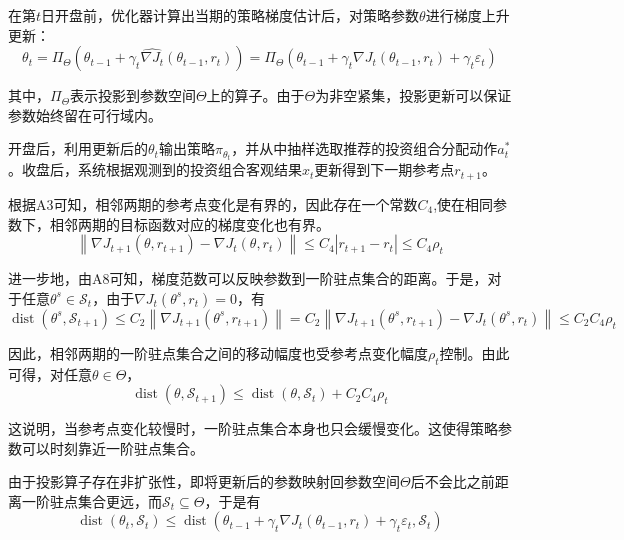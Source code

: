 \documentclass{sufethesismas}
\begin{document}
在第$t$日开盘前，优化器计算出当期的策略梯度估计后，对策略参数$\theta$进行梯度上升更新：
\begin{equation}
\theta_t
=
\Pi_{\Theta}
\left(
\theta_{t-1}
+
\gamma_t
\widehat{\nabla J_t}(\theta_{t-1},r_t)
\right)
=
\Pi_{\Theta}
\left(
\theta_{t-1}
+
\gamma_t \nabla J_t(\theta_{t-1},r_t)
+
\gamma_t \varepsilon_t
\right)
\end{equation}

其中，$\Pi_{\Theta}$表示投影到参数空间$\Theta$上的算子。由于$\Theta$为非空紧集，投影更新可以保证参数始终留在可行域内。

开盘后，利用更新后的$\theta_t$输出策略$\pi_{\theta_t}$，并从中抽样选取推荐的投资组合分配动作$a_t^*$。收盘后，系统根据观测到的投资组合客观结果$x_t$更新得到下一期参考点$r_{t+1}$。

根据A3可知，相邻两期的参考点变化是有界的，因此存在一个常数$C_4$,使在相同参数下，相邻两期的目标函数对应的梯度变化也有界。
\begin{equation}
\left\|
\nabla J_{t+1}(\theta,r_{t+1})-\nabla J_t(\theta,r_t)
\right\|
\le
C_4
\left|
r_{t+1}-r_t
\right|
\le
C_4 \rho_t
\end{equation}

进一步地，由A8可知，梯度范数可以反映参数到一阶驻点集合的距离。于是，对于任意$\theta^s \in \mathcal S_t$，由于$\nabla J_t(\theta^s,r_t)=0$，有
\begin{equation}
\operatorname{dist}(\theta^s,\mathcal S_{t+1})
\le
C_2
\left\|
\nabla J_{t+1}(\theta^s,r_{t+1})
\right\|
=
C_2
\left\|
\nabla J_{t+1}(\theta^s,r_{t+1})-\nabla J_t(\theta^s,r_t)
\right\|
\le
C_2 C_4 \rho_t
\end{equation}

因此，相邻两期的一阶驻点集合之间的移动幅度也受参考点变化幅度$\rho_t$控制。由此可得，对任意$\theta \in \Theta$，
\begin{equation}
\operatorname{dist}(\theta,\mathcal S_{t+1})
\le
\operatorname{dist}(\theta,\mathcal S_t)
+
C_2 C_4 \rho_t
\end{equation}

这说明，当参考点变化较慢时，一阶驻点集合本身也只会缓慢变化。这使得策略参数可以时刻靠近一阶驻点集合。

由于投影算子存在非扩张性，即将更新后的参数映射回参数空间$\Theta$后不会比之前距离一阶驻点集合更远，而$\mathcal S_t \subseteq \Theta$，于是有
\begin{equation}
\operatorname{dist}(\theta_t,\mathcal S_t)
\le
\operatorname{dist}
\left(
\theta_{t-1}
+
\gamma_t \nabla J_t(\theta_{t-1},r_t)
+
\gamma_t \varepsilon_t,
\mathcal S_t
\right)
\end{equation}
\end{document}
